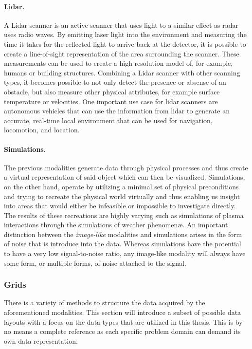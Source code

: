 \paragraph{Lidar. }  A Lidar scanner is an active scanner that uses light to a similar effect as radar uses radio waves.  By emitting laser light into the environment and measuring the time it takes for the reflected light to arrive back at the detector, it is possible to create a  line-of-sight representation of the area surrounding the scanner.  These measurements can be used to create a high-resolution  model of, for example, humans or building structures.  Combining a Lidar scanner with other scanning types, it becomes possible to not only detect the presence or absense of an obstacle, but also measure other physical attributes, for example surface temperature or velocities.  One important use case for lidar scanners are autonomous vehicles that can use the information from lidar to generate an accurate, real-time  local environment that can be used for navigation, locomotion, and location.

\paragraph{Simulations. }  The previous modalities generate data through physical processes and thus create a virtual representation of said object which can then be visualized.  Simulations, on the other hand, operate by utilizing a minimal set of physical preconditions and trying to recreate the physical world virtually and thus enabling us insight into areas that would either be infeasible or impossible to investigate directly.  The results of these recreations are highly varying such as simulations of plasma interactions through the simulations of weather phenomen\ae .  An important distinction between the \emph{image-like} modalities and simulations arises in the form of noise that is introduce into the data.  Whereas simulations have the potential to have a very low signal-to-noise ratio, any image-like modality will always have some form, or multiple forms, of noise attached to the signal.

\subsubsection{Grids} \label{cha:intro:vp:da:grids}
There is a variety of methods to structure the data acquired by the aforementioned modalities.  This section will introduce a subset of possible data layouts with a focus on the data types that are utilized in this thesis.  This is by no means a complete reference as each specific problem domain can demand its own data representation.

